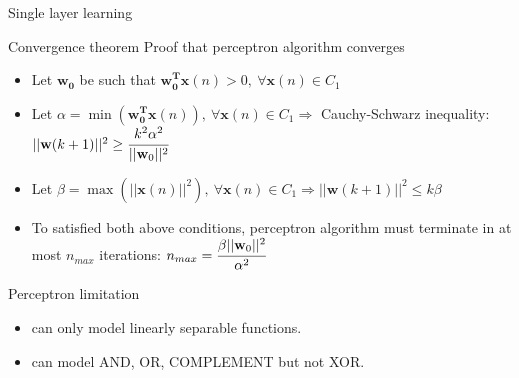 \documentclass[9pt,t]{beamer}
\begin{document}
\begin{frame}{Single layer learning}
    \begin{alertblock}{Convergence theorem}
        Proof that perceptron algorithm converges
        \begin{itemize}
            \item Let $ \mathbf{w_0} $ be such that $ \mathbf{w_0^T x}(n) > 0, ~ \forall \mathbf{x}(n) \in C_1 $
            \item Let $ \alpha = \min(\mathbf{w_0^T x}(n)), ~ \forall \mathbf{x}(n) \in C_1 \Rightarrow $ Cauchy-Schwarz inequality: $ ||\mathbf{w}(k+1)||^2 \geq \cfrac{k^2 \alpha^2}{||\textbf{w}_0||^2} $
            \item Let $ \beta  = \max(||\textbf{x}(n)||^2), ~ \forall \mathbf{x}(n) \in C_1  \Rightarrow ||\mathbf{w}(k+1)||^2 \leq k \beta $
            \item To satisfied both above conditions, perceptron algorithm must terminate in at most $ n_{max} $ iterations: $ n_{max} = \cfrac{\beta ||\textbf{w}_0||^2}{\alpha^2} $
        \end{itemize}
    \end{alertblock}
    \begin{alertblock}{Perceptron limitation}
        \begin{itemize}
            \item can only model linearly separable functions.
            \item can model AND, OR, COMPLEMENT but not XOR.
        \end{itemize}
    \end{alertblock}
\end{frame}
\end{document}

